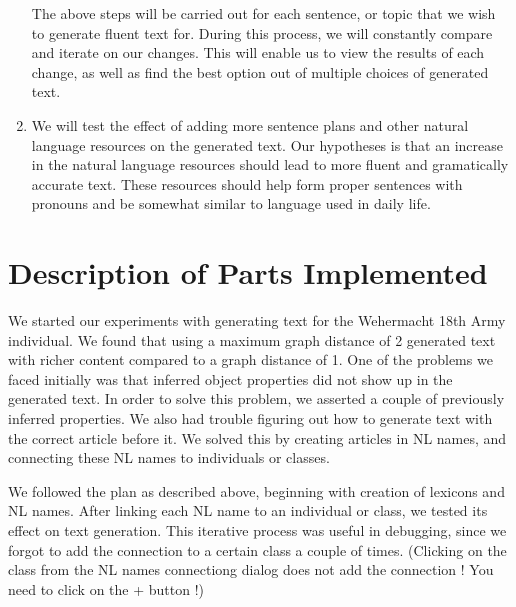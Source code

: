 \documentclass[12pt, letterpaper]{article}
\begin{document}
\begin{enumerate}
      The above steps will be carried out for each sentence, or topic that we wish to generate fluent text for.
      During this process, we will constantly compare and iterate on our changes.
      This will enable us to view the results of each change, as well as find the best option out of multiple choices
      of generated text.

  		\item
      We will test the effect of adding more sentence plans and other natural language resources on the generated text.
      Our hypotheses is that an increase in the natural language resources should lead to more fluent and gramatically
      accurate text.    
      These resources should help form proper sentences with pronouns and be somewhat similar to language used in 
      daily life.
  		
  	
  	\end{enumerate}
  
  \pagebreak

  \section*{Description of Parts Implemented}

    We started our experiments with generating text for the Wehermacht 18th Army individual. 
    We found that using a maximum graph distance of 2 generated text with richer content compared to a graph distance of 1.
    One of the problems we faced initially was that inferred object properties did not show up in the generated text. 
    In order to solve this problem, we asserted a couple of previously inferred properties.
    We also had trouble figuring out how to generate text with the correct article before it. 
    We solved this by creating articles in NL names, and connecting these NL names to individuals or classes.

    \vspace{4mm}

    \noindent
    We followed the plan as described above, beginning with creation of lexicons and NL names.
    After linking each NL name to an individual or class, we tested its effect on text generation.
    This iterative process was useful in debugging, since we forgot to add the connection to a certain class a couple of
    times. (Clicking on the class from the NL names connectiong dialog does not add the connection ! You need to click 
    on the + button !)

    \vspace{4mm}
\end{document}
